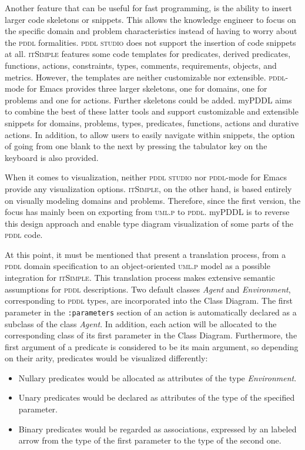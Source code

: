 \documentclass[a4paper,12pt]{report}
\newcommand{\mypddl}{\smallerft[0.8]{myPDDL}\xspace}
\newcommand{\pddlstudio}{\textsc{pddl studio}\xspace}
\newcommand{\itsimple}{\textsc{itSimple}\xspace}
\newcommand{\pddlmode}{\textsc{pddl}-mode\xspace}
\newcommand{\pddl}{\textsc{pddl}\xspace}
\newcommand\smallerft[2][0.85]{{\scalefont{#1}#2}}
\begin{document}
Another feature that can be useful for fast programming, is the
ability to insert larger code skeletons or snippets. This allows the
knowledge engineer to focus on the specific domain and problem
characteristics instead of having to worry about the \pddl
formalities. \pddlstudio does not support the insertion of code
snippets at all. \itsimple features some code templates for
predicates, derived predicates, functions, actions, constraints,
types, comments, requirements, objects, and metrics. However, the
templates are neither customizable nor extensible. \pddlmode for Emacs
provides three larger skeletons, one for domains, one for problems and
one for actions. Further skeletons could be added. \mypddl aims to
combine the best of these latter tools and support customizable and
extensible snippets for domains, problems, types, predicates,
functions, actions and durative actions. In addition, to allow users
to easily navigate within snippets, the option of going from one blank
to the next by pressing the tabulator key \keys{\tab} on the keyboard
is also provided.

When it comes to visualization, neither \pddlstudio nor \pddlmode for
Emacs provide any visualization options. \itsimple, on the other hand,
is based entirely on visually modeling domains and problems.
Therefore, since the first version, the focus has mainly been on
exporting from \textsc{uml.p} to \pddl. \mypddl is to reverse this
design approach and enable type diagram visualization of some parts of
the \pddl code.

At this point, it must be mentioned that
\textcite{tonidandel2006reading} present a translation process, from a
\pddl domain specification to an object-oriented \textsc{uml.p} model
as a possible integration for \itsimple. This translation process
makes extensive semantic assumptions for \pddl descriptions. Two
default classes \emph{Agent} and \emph{Environment}, corresponding to \pddl
types, are incorporated into the Class Diagram. The first parameter in
the \texttt{:parameters} section of an action is automatically declared as a
subclass of the class \emph{Agent}. In addition, each action will be
allocated to the corresponding class of its first parameter in the
Class Diagram. Furthermore, the first argument of a predicate is
considered to be its main argument, so depending on their arity,
predicates would be visualized differently:

\begin{itemize}
\item Nullary predicates would be allocated as attributes of the type
\emph{Environment}.
\item Unary predicates would be declared as attributes of the type of the
specified parameter.
\item Binary predicates would be regarded as associations, expressed by an
labeled arrow from the type of the first parameter to the type of
the second one.
\end{itemize}
\end{document}
